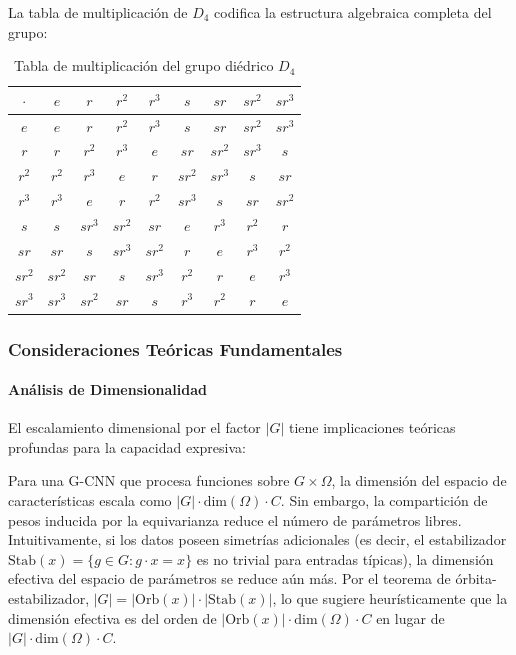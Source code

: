La tabla de multiplicación de $D_4$ codifica la estructura algebraica completa del grupo:

\begin{table}[h]
\centering
\small
\begin{tabular}{|c|c|c|c|c|c|c|c|c|}
\hline
$\cdot$ & $e$ & $r$ & $r^2$ & $r^3$ & $s$ & $sr$ & $sr^2$ & $sr^3$ \\
\hline
$e$ & $e$ & $r$ & $r^2$ & $r^3$ & $s$ & $sr$ & $sr^2$ & $sr^3$ \\
$r$ & $r$ & $r^2$ & $r^3$ & $e$ & $sr$ & $sr^2$ & $sr^3$ & $s$ \\
$r^2$ & $r^2$ & $r^3$ & $e$ & $r$ & $sr^2$ & $sr^3$ & $s$ & $sr$ \\
$r^3$ & $r^3$ & $e$ & $r$ & $r^2$ & $sr^3$ & $s$ & $sr$ & $sr^2$ \\
$s$ & $s$ & $sr^3$ & $sr^2$ & $sr$ & $e$ & $r^3$ & $r^2$ & $r$ \\
$sr$ & $sr$ & $s$ & $sr^3$ & $sr^2$ & $r$ & $e$ & $r^3$ & $r^2$ \\
$sr^2$ & $sr^2$ & $sr$ & $s$ & $sr^3$ & $r^2$ & $r$ & $e$ & $r^3$ \\
$sr^3$ & $sr^3$ & $sr^2$ & $sr$ & $s$ & $r^3$ & $r^2$ & $r$ & $e$ \\
\hline
\end{tabular}
\caption{Tabla de multiplicación del grupo diédrico $D_4$}
\label{tab:d4_multiplication}
\end{table}

\subsubsection{Consideraciones Teóricas Fundamentales}

\paragraph{Análisis de Dimensionalidad}

El escalamiento dimensional por el factor $|G|$ tiene implicaciones teóricas profundas para la capacidad expresiva:

\begin{remark}\label{thm:tradeoff_dimensional}
Para una G-CNN que procesa funciones sobre $G \times \Omega$, la dimensión del espacio de características escala como $|G| \cdot \text{dim}(\Omega) \cdot C$. Sin embargo, la compartición de pesos inducida por la equivarianza reduce el número de parámetros libres. Intuitivamente, si los datos poseen simetrías adicionales (es decir, el estabilizador $\text{Stab}(x) = \{g \in G : g \cdot x = x\}$ es no trivial para entradas típicas), la dimensión efectiva del espacio de parámetros se reduce aún más. Por el teorema de órbita-estabilizador, $|G| = |\text{Orb}(x)| \cdot |\text{Stab}(x)|$, lo que sugiere heurísticamente que la dimensión efectiva es del orden de $|\text{Orb}(x)| \cdot \text{dim}(\Omega) \cdot C$ en lugar de $|G| \cdot \text{dim}(\Omega) \cdot C$.
\end{remark}


